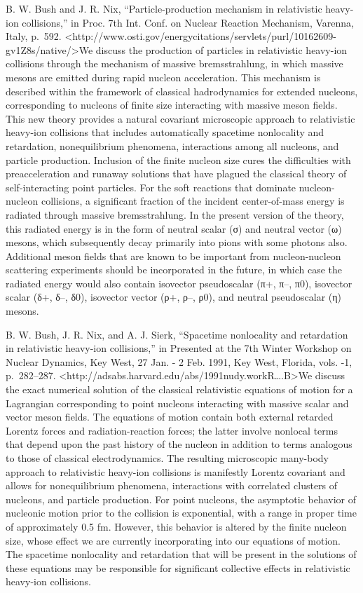 \documentclass[]{article}
\begin{document}
B. W. Bush and J. R. Nix, ``Particle-production mechanism in
relativistic heavy-ion collisions,'' in Proc. 7th Int. Conf. on Nuclear
Reaction Mechanism, Varenna, Italy, p.~592.
\textless{}http://www.osti.gov/energycitations/servlets/purl/10162609-gv1Z8s/native/\textgreater{}We
discuss the production of particles in relativistic heavy-ion collisions
through the mechanism of massive bremsstrahlung, in which massive mesons
are emitted during rapid nucleon acceleration. This mechanism is
described within the framework of classical hadrodynamics for extended
nucleons, corresponding to nucleons of finite size interacting with
massive meson fields. This new theory provides a natural covariant
microscopic approach to relativistic heavy-ion collisions that includes
automatically spacetime nonlocality and retardation, nonequilibrium
phenomena, interactions among all nucleons, and particle production.
Inclusion of the finite nucleon size cures the difficulties with
preacceleration and runaway solutions that have plagued the classical
theory of self-interacting point particles. For the soft reactions that
dominate nucleon-nucleon collisions, a significant fraction of the
incident center-of-mass energy is radiated through massive
bremsstrahlung. In the present version of the theory, this radiated
energy is in the form of neutral scalar (σ) and neutral vector (ω)
mesons, which subsequently decay primarily into pions with some photons
also. Additional meson fields that are known to be important from
nucleon-nucleon scattering experiments should be incorporated in the
future, in which case the radiated energy would also contain isovector
pseudoscalar (π+, π--, π0), isovector scalar (δ+, δ--, δ0), isovector
vector (ρ+, ρ--, ρ0), and neutral pseudoscalar (η) mesons.

B. W. Bush, J. R. Nix, and A. J. Sierk, ``Spacetime nonlocality and
retardation in relativistic heavy-ion collisions,'' in Presented at the
7th Winter Workshop on Nuclear Dynamics, Key West, 27 Jan. - 2 Feb.
1991, Key West, Florida, vols. -1, p.~282--287.
\textless{}http://adsabs.harvard.edu/abs/1991nudy.workR\ldots{}.B\textgreater{}We
discuss the exact numerical solution of the classical relativistic
equations of motion for a Lagrangian corresponding to point nucleons
interacting with massive scalar and vector meson fields. The equations
of motion contain both external retarded Lorentz forces and
radiation-reaction forces; the latter involve nonlocal terms that depend
upon the past history of the nucleon in addition to terms analogous to
those of classical electrodynamics. The resulting microscopic many-body
approach to relativistic heavy-ion collisions is manifestly Lorentz
covariant and allows for nonequilibrium phenomena, interactions with
correlated clusters of nucleons, and particle production. For point
nucleons, the asymptotic behavior of nucleonic motion prior to the
collision is exponential, with a range in proper time of approximately
0.5 fm. However, this behavior is altered by the finite nucleon size,
whose effect we are currently incorporating into our equations of
motion. The spacetime nonlocality and retardation that will be present
in the solutions of these equations may be responsible for significant
collective effects in relativistic heavy-ion collisions.
\end{document}
